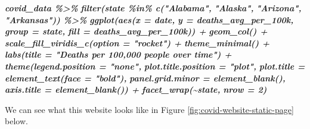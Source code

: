 \documentclass[
]{book}
\newenvironment{Shaded}{\begin{snugshade}}{\end{snugshade}}
\newcommand{\InformationTok}[1]{\textcolor[rgb]{0.56,0.35,0.01}{\textbf{\textit{#1}}}}
\begin{document}
\begin{Shaded}
\begin{Highlighting}[]
\InformationTok{covid\_data \%\textgreater{}\% }
\InformationTok{  filter(state \%in\% c("Alabama",}
\InformationTok{                      "Alaska",}
\InformationTok{                      "Arizona",}
\InformationTok{                      "Arkansas")) \%\textgreater{}\% }
\InformationTok{  ggplot(aes(x = date,}
\InformationTok{             y = deaths\_avg\_per\_100k,}
\InformationTok{             group = state,}
\InformationTok{             fill = deaths\_avg\_per\_100k)) +}
\InformationTok{  geom\_col() +}
\InformationTok{  scale\_fill\_viridis\_c(option = "rocket") +}
\InformationTok{  theme\_minimal() +}
\InformationTok{  labs(title = "Deaths per 100,000 people over time") +}
\InformationTok{  theme(legend.position = "none",}
\InformationTok{        plot.title.position = "plot",}
\InformationTok{        plot.title = element\_text(face = "bold"),}
\InformationTok{        panel.grid.minor = element\_blank(),}
\InformationTok{        axis.title = element\_blank()) +}
\InformationTok{  facet\_wrap(\textasciitilde{}state,}
\InformationTok{             nrow = 2)}
\InformationTok{\textasciigrave{}\textasciigrave{}\textasciigrave{}}
\end{Highlighting}
\end{Shaded}

We can see what this website looks like in Figure \ref{fig:covid-website-static-page} below.
\end{document}
